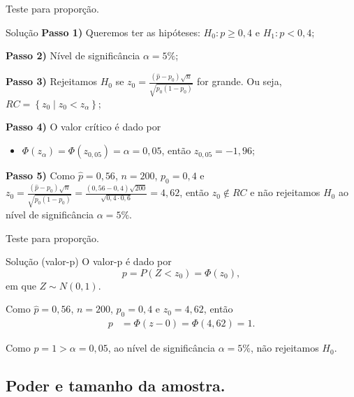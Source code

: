 \documentclass[8pt]{beamer}
\begin{document}
\begin{frame}{Teste para proporção.}

\large

\begin{block}{Solução}
	\textbf{Passo 1)} Queremos ter as hipóteses: $H_0: p \geq 0,4$ e $H_1: p < 0,4$;
	
	\textbf{Passo 2)} Nível de significância $\alpha = 5\%$;
	
	\textbf{Passo 3)} Rejeitamos $H_0$ se $z_0 = \frac{(\hat{p} - p_0)\sqrt{n}}{\sqrt{p_0(1-p_0)}}$ for grande. Ou seja, $RC=\left\{ z_0 \mid z_0 < z_\alpha \right\}$;
	
	\textbf{Passo 4)} O valor crítico é dado por
	\begin{itemize}
		\item $\Phi\left( z_\alpha \right) = \Phi\left( z_{0,05} \right) = \alpha = 0,05$, então $z_{0,05} = -1,96$;
	\end{itemize}

	\textbf{Passo 5)} Como $\hat{p} = 0,56$, $n=200$, $p_0=0,4$ e $z_0= \frac{(\hat{p} - p_0)\sqrt{n}}{\sqrt{p_0(1-p_0)}}=\frac{(0,56-0,4)\sqrt{200}}{\sqrt{0,4 \cdot 0,6}} = 4,62$, então $z_0 \not\in RC$ e não rejeitamos $H_0$ ao nível de significância $\alpha = 5\%$.
\end{block}

\normalsize
\end{frame}

\begin{frame}{Teste para proporção.}

\large
\begin{block}{Solução (valor-p)}
	O valor-p é dado por
	$$p=P\left(Z < z_0 \right) =  \Phi\left(z_0\right),$$
	em que $Z \sim N(0,1)$.
	\vfill
	
	Como $\hat{p}=0,56$, $n=200$, $p_0=0,4$ e $z_0=4,62$, então
	\begin{align*}
	p &= \Phi \left( z-0 \right) = \Phi \left( 4,62 \right) = 1.
	\end{align*}
	\vfill
	
	Como $p=1 > \alpha = 0,05$, ao nível de significância $\alpha=5\%$, não rejeitamos $H_0$.
\end{block}
\normalsize

\end{frame}

\subsection{Poder e tamanho da amostra.}
\end{document}
